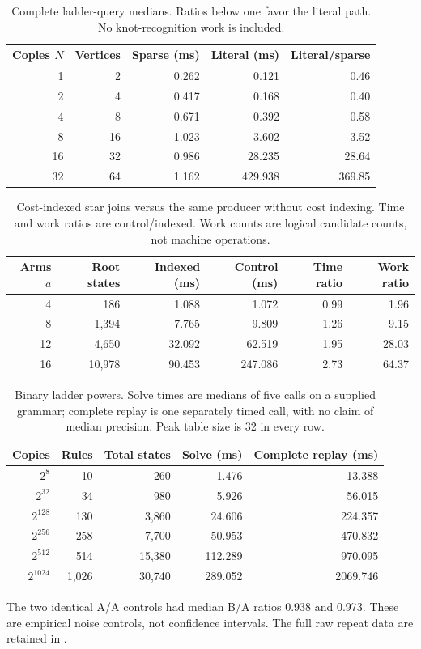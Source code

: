 \begin{table}[ht]
\centering
\begin{tabular}{rrrrr}
\toprule
Copies $N$ & Vertices & Sparse (ms) & Literal (ms) & Literal/sparse\\
\midrule
1 & 2 & 0.262 & 0.121 & 0.46\\
2 & 4 & 0.417 & 0.168 & 0.40\\
4 & 8 & 0.671 & 0.392 & 0.58\\
8 & 16 & 1.023 & 3.602 & 3.52\\
16 & 32 & 0.986 & 28.235 & 28.64\\
32 & 64 & 1.162 & 429.938 & 369.85\\
\bottomrule
\end{tabular}
\caption{Complete ladder-query medians. Ratios below one favor the literal path. No knot-recognition work is included.}
\label{tab:ladder}
\end{table}
\begin{table}[ht]
\centering
\begin{tabular}{rrrrrr}
\toprule
Arms $a$ & Root states & Indexed (ms) & Control (ms) & Time ratio & Work ratio\\
\midrule
4 & 186 & 1.088 & 1.072 & 0.99 & 1.96\\
8 & 1,394 & 7.765 & 9.809 & 1.26 & 9.15\\
12 & 4,650 & 32.092 & 62.519 & 1.95 & 28.03\\
16 & 10,978 & 90.453 & 247.086 & 2.73 & 64.37\\
\bottomrule
\end{tabular}
\caption{Cost-indexed star joins versus the same producer without cost indexing. Time and work ratios are control/indexed. Work counts are logical candidate counts, not machine operations.}
\label{tab:stars}
\end{table}
\begin{table}[ht]
\centering
\begin{tabular}{rrrrr}
\toprule
Copies & Rules & Total states & Solve (ms) & Complete replay (ms)\\
\midrule
$2^{8}$ & 10 & 260 & 1.476 & 13.388\\
$2^{32}$ & 34 & 980 & 5.926 & 56.015\\
$2^{128}$ & 130 & 3,860 & 24.606 & 224.357\\
$2^{256}$ & 258 & 7,700 & 50.953 & 470.832\\
$2^{512}$ & 514 & 15,380 & 112.289 & 970.095\\
$2^{1024}$ & 1,026 & 30,740 & 289.052 & 2069.746\\
\bottomrule
\end{tabular}
\caption{Binary ladder powers. Solve times are medians of five calls on a supplied grammar; complete replay is one separately timed call, with no claim of median precision. Peak table size is 32 in every row.}
\label{tab:binary}
\end{table}
The two identical A/A controls had median B/A ratios 0.938 and 0.973. These are empirical noise controls, not confidence intervals. The full raw repeat data are retained in \mbox{}.
